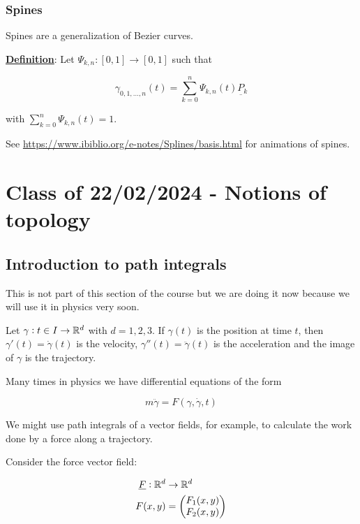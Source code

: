 \documentclass[10pt]{extarticle}
\renewcommand{\vec}[1]{\underbar{\ensuremath{#1}}}
\begin{document}
\subsubsection{Spines}

Spines are a generalization of Bezier curves.

\textbf{\underline{Definition}}: Let $\Psi_{k, n}: [0, 1]\to [0, 1]$ such that

$$
    \gamma_{0,1, \ldots, n}(t) = \sum_{k=0}^n \Psi_{k, n}(t) \vec{P_k}
$$

with $\sum_{k=0}^n \Psi_{k, n}(t) = 1$.

See \url{https://www.ibiblio.org/e-notes/Splines/basis.html} for animations of spines.

\section{Class of 22/02/2024 - Notions of topology}


\subsection{Introduction to path integrals}

This is not part of this section of the course but we are doing it now because we will use it in physics very soon.

Let $\gamma: t \in I \to \mathbb{R}^d$ with $d = 1, 2, 3$.
If $\gamma(t)$ is the position at time $t$, then $\gamma'(t) = \dot{\gamma}(t)$ is the velocity, $\gamma''(t) = \ddot{\gamma}(t)$ is the acceleration and the image of $\gamma$ is the trajectory.

Many times in physics we have differential equations of the form

$$
    m \ddot{\gamma} = F(\gamma, \dot{\gamma}, t)
$$

We might use path integrals of a vector fields, for example, to calculate the work done by a force along a trajectory.

Consider the force vector field:

\begin{align*}
    \vec{F}: \R^d & \to \R^d                \\
    F(x,y)        & = \begin{pmatrix}
                          F_1(x, y) \\ F_2(x, y)
                      \end{pmatrix}
\end{align*}
\end{document}

